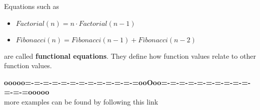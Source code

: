 \documentclass{ximera}
\begin{document}
Equations such as

\begin{itemize}
\item $Factorial(n) = n \cdot Factorial(n-1)$
\item $Fibonacci(n) = Fibonacci(n-1) + Fibonacci(n-2)$
\end{itemize}

are called \textbf{functional equations}.  They define how function values relate to other function values.






















\begin{center}
\textbf{\textcolor{green!50!black}{ooooo=-=-=-=-=-=-=-=-=-=-=-=-=ooOoo=-=-=-=-=-=-=-=-=-=-=-=-=ooooo}} \\

more examples can be found by following this link\\ 

\end{center}
\end{document}
